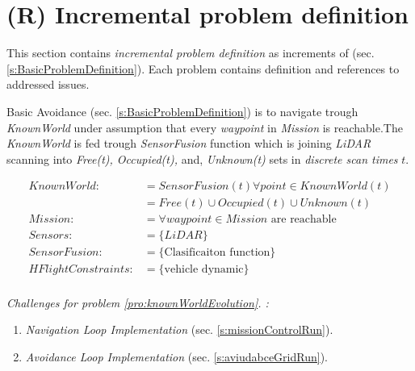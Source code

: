\section{(R) Incremental problem definition}\label{s:IncrementalProblemDefinition}

\noindent This section contains \emph{incremental problem definition} as increments of (sec. \ref{s:BasicProblemDefinition}). Each problem contains definition and references to addressed issues.

\begin{problem}{Basic Avoidance}\label{pro:knownWorldEvolution} (sec. \ref{s:BasicProblemDefinition}) is to navigate trough \emph{KnownWorld} under assumption that every \emph{waypoint} in \emph{Mission} is reachable.The \emph{KnownWorld} is fed trough \emph{SensorFusion} function which is joining \emph{LiDAR} scanning into \emph{Free(t), Occupied(t),} and, \emph{Unknown(t)} sets in \emph{discrete scan times} $t$. 

    \begin{equation}\label{eq:basicProblemDefinition}
        \begin{aligned}
            KnownWorld:&= SensorFusion(t)\forall point\in KnownWorld(t)\\
                       &=Free(t) \cup Occupied(t) \cup Unknown(t)\\
            Mission:&= \forall waypoint\in Mission \text{ are reachable}\\
            Sensors:&= \{LiDAR\}\\
            SensorFusion:&= \{\text{Clasificaiton function}\}\\
            HFlightConstraints:&=\{\text{vehicle dynamic}\}\\
        \end{aligned}
    \end{equation}
    
    
    \noindent \emph{Challenges for problem  \ref{pro:knownWorldEvolution}. :}
    \begin{enumerate}
        \item \emph{Navigation Loop Implementation} (sec. \ref{s:missionControlRun}).
        
        \item \emph{Avoidance Loop Implementation}  (sec. \ref{s:aviudabceGridRun}).
    \end{enumerate}   
\end{problem}



